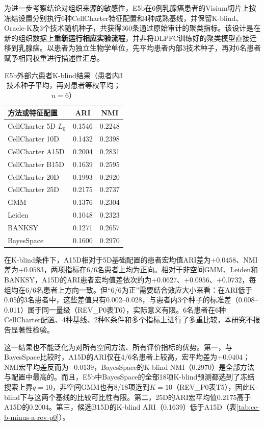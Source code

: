 为进一步考察结论对组织来源的敏感性，E5b在6例乳腺癌患者的Visium切片上按冻结设置分别执行6种CellCharter特征配置和4种成熟基线，并保留K-blind、Oracle-K及3个技术随机种子，共获得360条通过原始审计的聚类指标。该设计是在新的组织数据上\textbf{重新运行相应实验流程}，并非将DLPFC训练好的聚类模型直接迁移到乳腺癌。以患者为独立生物学单位，先平均患者内部3技术种子，再对6名患者赋予相同权重进行描述性汇总。

\begin{table}[htbp]
\centering
\caption{E5b外部六患者K-blind结果（患者内3技术种子平均，再对患者等权平均；$n=6$）}
\label{tab:cellcharter-e5b-v1}
\begin{tabular}{lcc}
\toprule
方法或特征配置 & ARI & NMI\\
\midrule
CellCharter 5D $L_0$ & 0.1546 & 0.2248\\
CellCharter 10D & 0.1432 & 0.2398\\
CellCharter A15D & 0.2004 & 0.2831\\
CellCharter B15D & 0.1639 & 0.2595\\
CellCharter 20D & 0.1993 & 0.2920\\
CellCharter 25D & 0.2175 & 0.2737\\
GMM & 0.1376 & 0.2304\\
Leiden & 0.1048 & 0.2323\\
BANKSY & 0.1271 & 0.2657\\
BayesSpace & 0.1600 & 0.2970\\
\bottomrule
\end{tabular}
\end{table}

在K-blind条件下，A15D相对于5D基础配置的患者宏均值ARI差为$+0.0458$、NMI差为$+0.0583$，两项指标在6/6名患者上均为正向。相对于非空间GMM、Leiden和BANKSY，A15D的ARI患者宏均值差依次约为$+0.0627$、$+0.0956$、$+0.0732$，每组均在6/6名患者上方向一致。但“6/6为正”需要结合效应大小来看：在ARI低于0.05的3名患者中，这些差值只有0.002--0.028，与患者内3个种子的标准差（0.008--0.011）属于同一量级（REV\_P0表T6），实际意义有限。6名患者在6种CellCharter配置、4种基线、2种K条件和多个指标上进行了多重比较，本研究不报告显著性检验。

这一结果也不能泛化为对所有空间方法、所有评价指标的优势。第一，与BayesSpace比较时，A15D的ARI仅在4/6名患者上较高，宏平均差为$+0.0404$；NMI宏平均差反而为$-0.0139$，BayesSpace的K-blind NMI（0.2970）是全部方法与配置中最高的。而且，E5b中BayesSpace的全部18项K-blind预测都选到了冻结搜索上界$q=10$，非空间GMM也有8/18项选到$K=10$（REV\_P0表T5），因此K-blind下与这两个基线的比较可比性有限。第二，25D的ARI宏平均值0.2175高于A15D的0.2004。第三，候选B15D的K-blind ARI（0.1639）低于A15D（表\ref{tab:cc-b-minus-a-rev-p0}）。


